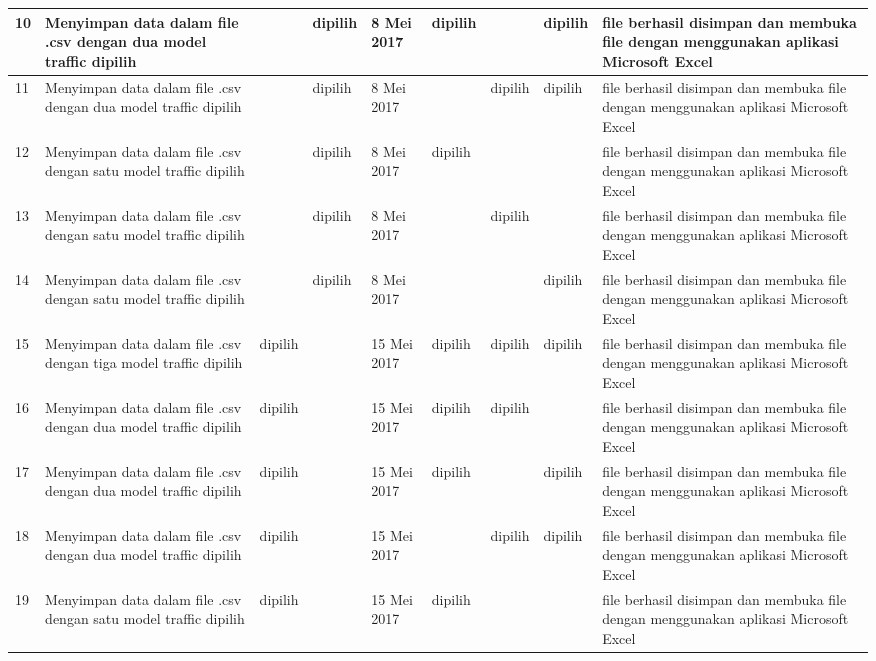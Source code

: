\begin{longtable}{|p{0.5cm}|p{2cm}|p{1.3cm}|p{1.3cm}|p{1.5cm}|p{1.8cm}|p{1.8cm}|p{1.8cm}|p{2cm}|}
    10 & Menyimpan data dalam file .csv dengan dua model traffic dipilih & ~ & dipilih & 8 Mei 2017 & dipilih & ~ & dipilih & file berhasil disimpan dan membuka file dengan menggunakan aplikasi Microsoft Excel \\ \hline
    11 & Menyimpan data dalam file .csv dengan dua model traffic dipilih & ~ & dipilih & 8 Mei 2017 & ~ & dipilih & dipilih & file berhasil disimpan dan membuka file dengan menggunakan aplikasi Microsoft Excel \\ \hline
    12 & Menyimpan data dalam file .csv dengan satu model traffic dipilih & ~ & dipilih & 8 Mei 2017 & dipilih & ~ & ~ & file berhasil disimpan dan membuka file dengan menggunakan aplikasi Microsoft Excel \\ \hline
    13 & Menyimpan data dalam file .csv dengan satu model traffic dipilih & ~ & dipilih & 8 Mei 2017 & ~ & dipilih & ~ & file berhasil disimpan dan membuka file dengan menggunakan aplikasi Microsoft Excel \\ \hline
    14 & Menyimpan data dalam file .csv dengan satu model traffic dipilih & ~ & dipilih & 8 Mei 2017 & ~ & ~ & dipilih & file berhasil disimpan dan membuka file dengan menggunakan aplikasi Microsoft Excel \\ \hline
        15 & Menyimpan data dalam file .csv dengan tiga model traffic dipilih & dipilih & ~ & 15 Mei 2017 & dipilih & dipilih & dipilih & file berhasil disimpan dan membuka file dengan menggunakan aplikasi Microsoft Excel \\ \hline
        16 & Menyimpan data dalam file .csv dengan dua model traffic dipilih & dipilih & ~ & 15 Mei 2017 & dipilih & dipilih & ~ & file berhasil disimpan dan membuka file dengan menggunakan aplikasi Microsoft Excel \\ \hline
        17 & Menyimpan data dalam file .csv dengan dua model traffic dipilih & dipilih & ~ & 15 Mei 2017 & dipilih & ~ & dipilih & file berhasil disimpan dan membuka file dengan menggunakan aplikasi Microsoft Excel \\ \hline
        18 & Menyimpan data dalam file .csv dengan dua model traffic dipilih & dipilih & ~ & 15 Mei 2017 & ~ & dipilih & dipilih & file berhasil disimpan dan membuka file dengan menggunakan aplikasi Microsoft Excel \\ \hline
        19 & Menyimpan data dalam file .csv dengan satu model traffic dipilih & dipilih & ~ & 15 Mei 2017 & dipilih & ~ & ~ & file berhasil disimpan dan membuka file dengan menggunakan aplikasi Microsoft Excel \\ \hline

\end{longtable}
